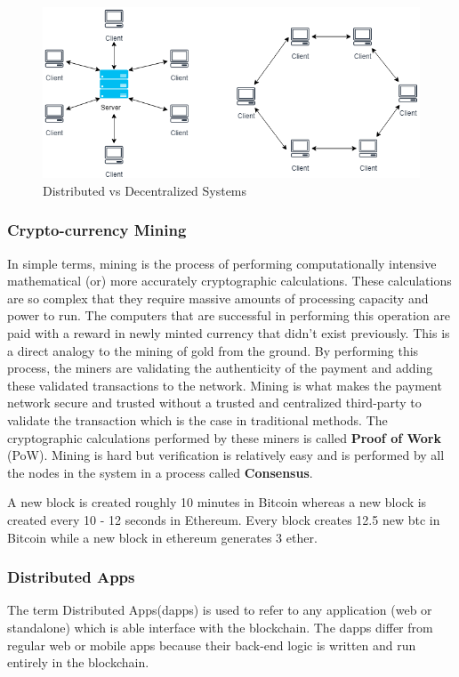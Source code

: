 \documentclass[11pt,openright]{report}
\begin{document}
\begin{figure}
	\centering
	\includegraphics[scale=0.5]{images/Decentralized.png}
	\caption{Distributed vs Decentralized Systems}
	\label{fig:Decentralized_Systems}
\end{figure}

\newpage
\subsubsection{Crypto-currency Mining}\label{crypto-mining}
In simple terms, mining is the process of performing computationally intensive mathematical (or) more accurately cryptographic calculations. These calculations are so complex that they require massive amounts of processing capacity and power to run. The computers that are successful in performing this operation are paid with a reward in newly minted currency that didn't exist previously. This is a direct analogy to the mining of gold from the ground. By performing this process, the miners are validating the authenticity of the payment and adding these validated transactions to the network. Mining is what makes the payment network secure and trusted without a trusted and centralized third-party to validate the transaction which is the case in traditional methods. The cryptographic calculations performed by these miners is called \textbf{Proof of Work} (PoW). Mining is hard but verification is relatively easy and is performed by all the nodes in the system in a process called \textbf{Consensus}.

A new block is created roughly 10 minutes in Bitcoin whereas a new block is created every 10 - 12 seconds in Ethereum. Every block creates 12.5 new btc in Bitcoin while a new block in ethereum generates 3 ether.

\subsubsection{Distributed Apps}
The term Distributed Apps(dapps) is used to refer to any application (web or standalone) which is able interface with the blockchain. 
The dapps differ from regular web or mobile apps because their back-end logic is written and run entirely in the blockchain.
\end{document}

